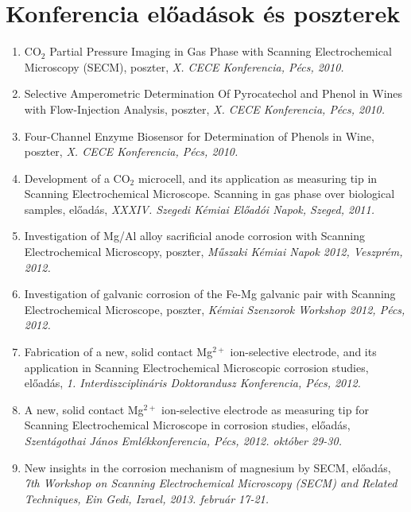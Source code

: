 \documentclass[11pt,a4paper,roman]{article}
\begin{document}
\section{Konferencia előadások és poszterek}
\begin{enumerate}
\item CO$_2$ Partial Pressure Imaging in Gas Phase with Scanning Electrochemical Microscopy (SECM), poszter, \emph{X. CECE Konferencia, Pécs, 2010.}

\item Selective Amperometric Determination Of Pyrocatechol and Phenol in Wines with Flow-Injection Analysis, poszter, \emph{X. CECE Konferencia, Pécs, 2010.}

\item Four-Channel Enzyme Biosensor for Determination of Phenols in Wine, poszter, \emph{X. CECE Konferencia, Pécs, 2010.}

\item Development of a CO$_2$ microcell, and its application as measuring tip in Scanning Electrochemical Microscope. Scanning in gas phase over biological samples, előadás, \emph{XXXIV. Szegedi Kémiai Előadói Napok, Szeged, 2011.}

\item Investigation of Mg/Al alloy sacrificial anode corrosion with Scanning Electrochemical Microscopy, poszter, \emph{Műszaki Kémiai Napok 2012, Veszprém, 2012.}

\item Investigation of galvanic corrosion of the Fe-Mg galvanic pair with Scanning Electrochemical Microscope, poszter, \emph{Kémiai Szenzorok Workshop 2012, Pécs, 2012.}

\item Fabrication of a new, solid contact Mg$^{2+}$ ion-selective electrode, and its application in Scanning Electrochemical Microscopic corrosion studies, előadás, \emph{1. Interdiszciplináris Doktorandusz Konferencia, Pécs, 2012.}

\item A new, solid contact Mg$^{2+}$ ion-selective electrode as measuring tip for Scanning Electrochemical Microscope in corrosion studies, előadás, \emph{Szentágothai János Emlékkonferencia, Pécs, 2012. október 29-30.}

\item New insights in the corrosion mechanism of magnesium by SECM, előadás, \emph{7th Workshop on Scanning Electrochemical Microscopy (SECM) and Related Techniques, Ein Gedi, Izrael, 2013. február 17-21.}


\end{enumerate}
\end{document}

